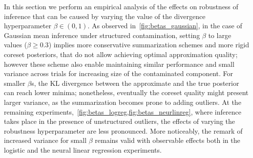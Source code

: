 In this section we perform an empirical analysis of the effects on robustness of inference that can be caused by varying the value of the divergence hyperparameter $\beta \in (0,1)$. As observed in~\cref{fig:betas_gaussian}, in the case of Gaussian mean inference under structured contamination, setting $\beta$ to large values ($\beta \geq 0.3$) implies more conservative summarization schemes and more rigid coreset posteriors, that do not allow achieving optimal approximation quality; however these scheme also enable maintaining similar performance and small variance across trials for increasing size of the contaminated component. For smaller $\beta$s, the KL divergence between the approximate and the true posterior can reach lower minima; nonetheless, eventually the coreset quality might present larger variance, as the summarization becomes prone to adding outliers. At the remaining experiments,~\cref{fig:betas_logreg,fig:betas_neurlinreg}, where inference takes place in the presence of unstructured outliers, the effects of varying the robustness hyperparameter are less pronounced. More noticeably, the remark of increased variance for small $\beta$ remains valid with observable effects both in the logistic and the neural linear regression experiments.


